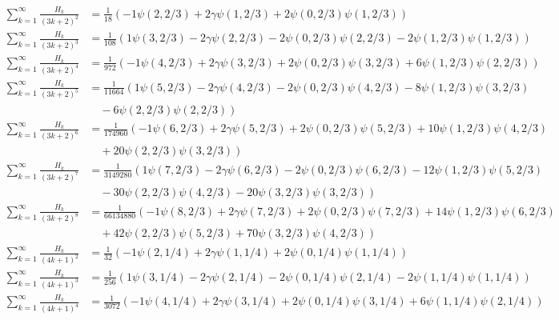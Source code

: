 \documentclass{article}
\theoremstyle{definition}
\begin{document}
\begin{align}
\sum_{k=1}^\infty \frac{H_k}{(3k+2)^2} &= \frac{ 1}{18}\left( -1\psi(2,2/3) +2\gamma\psi(1,2/3) +2\psi(0,2/3)\psi(1,2/3)\right) \\
\sum_{k=1}^\infty \frac{H_k}{(3k+2)^3} &= \frac{ 1}{108}\left(  1\psi(3,2/3) -2\gamma\psi(2,2/3) -2\psi(0,2/3)\psi(2,2/3) -2\psi(1,2/3)\psi(1,2/3)\right) \\
\sum_{k=1}^\infty \frac{H_k}{(3k+2)^4} &= \frac{ 1}{972}\left( -1\psi(4,2/3) +2\gamma\psi(3,2/3) +2\psi(0,2/3)\psi(3,2/3) +6\psi(1,2/3)\psi(2,2/3)\right) \\
\sum_{k=1}^\infty \frac{H_k}{(3k+2)^5} &= \frac{1}{11664}\left(  1\psi(5,2/3) -2\gamma\psi(4,2/3) -2\psi(0,2/3)\psi(4,2/3) -8\psi(1,2/3)\psi(3,2/3)  \right. \nonumber \\ &\left. \hspace{1em}
-6\psi(2,2/3)\psi(2,2/3)\right) \\
\sum_{k=1}^\infty \frac{H_k}{(3k+2)^6} &= \frac{ 1}{174960}\left( -1\psi(6,2/3) +2\gamma\psi(5,2/3) +2\psi(0,2/3)\psi(5,2/3) +10\psi(1,2/3)\psi(4,2/3)  \right. \nonumber \\ &\left. \hspace{1em}
+20\psi(2,2/3)\psi(3,2/3)\right) \\
\sum_{k=1}^\infty \frac{H_k}{(3k+2)^7} &= \frac{ 1}{3149280}\left(  1\psi(7,2/3) -2\gamma\psi(6,2/3) -2\psi(0,2/3)\psi(6,2/3) -12\psi(1,2/3)\psi(5,2/3)  \right. \nonumber \\ &\left. \hspace{1em}
-30\psi(2,2/3)\psi(4,2/3) -20\psi(3,2/3)\psi(3,2/3)\right) \\
\sum_{k=1}^\infty \frac{H_k}{(3k+2)^8} &= \frac{1}{66134880}\left( -1\psi(8,2/3) +2\gamma\psi(7,2/3) +2\psi(0,2/3)\psi(7,2/3) +14\psi(1,2/3)\psi(6,2/3)  \right. \nonumber \\ &\left. \hspace{1em}
+42\psi(2,2/3)\psi(5,2/3) +70\psi(3,2/3)\psi(4,2/3)\right) \\
\sum_{k=1}^\infty \frac{H_k}{(4k+1)^2} &= \frac{ 1}{32}\left( -1\psi(2,1/4) +2\gamma\psi(1,1/4) +2\psi(0,1/4)\psi(1,1/4)\right) \\
\sum_{k=1}^\infty \frac{H_k}{(4k+1)^3} &= \frac{ 1}{256}\left(  1\psi(3,1/4) -2\gamma\psi(2,1/4) -2\psi(0,1/4)\psi(2,1/4) -2\psi(1,1/4)\psi(1,1/4)\right) \\
\sum_{k=1}^\infty \frac{H_k}{(4k+1)^4} &= \frac{ 1}{3072}\left( -1\psi(4,1/4) +2\gamma\psi(3,1/4) +2\psi(0,1/4)\psi(3,1/4) +6\psi(1,1/4)\psi(2,1/4)\right) \\

\end{align}
\end{document}
